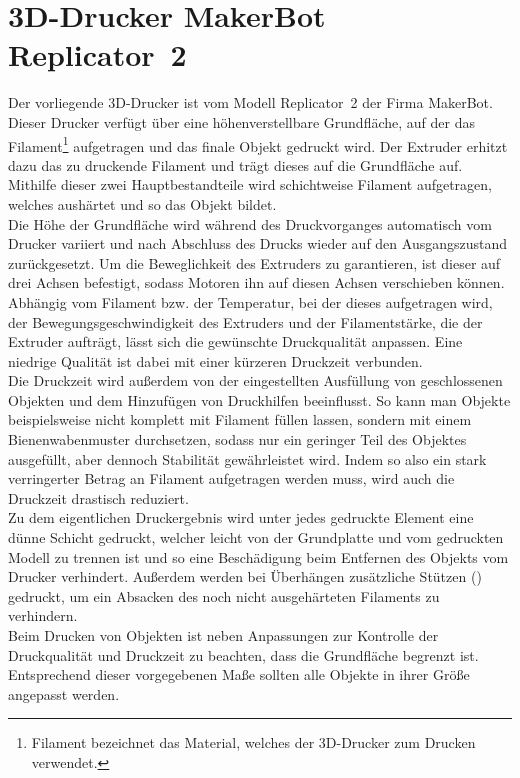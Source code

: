 \section{3D-Drucker MakerBot Replicator\texttrademark\ 2}
Der vorliegende 3D-Drucker ist vom Modell Replicator\texttrademark\ 2 der Firma MakerBot.
Dieser Drucker verfügt über eine höhenverstellbare Grundfläche, auf der das Filament\footnote{Filament bezeichnet das Material, welches der 3D-Drucker zum Drucken verwendet.} aufgetragen und das finale Objekt gedruckt wird.
Der Extruder erhitzt dazu das zu druckende Filament und trägt dieses auf die Grundfläche auf. 
Mithilfe dieser zwei Hauptbestandteile wird schichtweise Filament aufgetragen, welches aushärtet und so das Objekt bildet. \\
Die Höhe der Grundfläche wird während des Druckvorganges automatisch vom Drucker variiert und nach Abschluss des Drucks wieder auf den Ausgangszustand zurückgesetzt.
Um die Beweglichkeit des Extruders zu garantieren, ist dieser auf drei Achsen befestigt, sodass Motoren ihn auf diesen Achsen verschieben können. \\
Abhängig vom Filament bzw. der Temperatur, bei der dieses aufgetragen wird, der Bewegungsgeschwindigkeit des Extruders und der Filamentstärke, die der Extruder aufträgt, lässt sich die gewünschte Druckqualität anpassen.
Eine niedrige Qualität ist dabei mit einer kürzeren Druckzeit verbunden. \\
Die Druckzeit wird außerdem von der eingestellten Ausfüllung von geschlossenen Objekten und dem Hinzufügen von Druckhilfen beeinflusst.
So kann man Objekte beispielsweise nicht komplett mit Filament füllen lassen, sondern mit einem Bienenwabenmuster durchsetzen, sodass nur ein geringer Teil des Objektes ausgefüllt, aber dennoch Stabilität gewährleistet wird.
Indem so also ein stark verringerter Betrag an Filament aufgetragen werden muss, wird auch die Druckzeit drastisch reduziert. \\
Zu dem eigentlichen Druckergebnis wird unter jedes gedruckte Element eine dünne Schicht gedruckt, welcher leicht von der Grundplatte und vom gedruckten Modell zu trennen ist und so eine Beschädigung beim Entfernen des Objekts vom Drucker verhindert.
Außerdem werden bei Überhängen zusätzliche Stützen () gedruckt, um ein Absacken des noch nicht ausgehärteten Filaments zu verhindern.  \\
Beim Drucken von Objekten ist neben Anpassungen zur Kontrolle der Druckqualität und Druckzeit zu beachten, dass die Grundfläche begrenzt ist.
Entsprechend dieser vorgegebenen Maße sollten alle Objekte in ihrer Größe angepasst werden.

